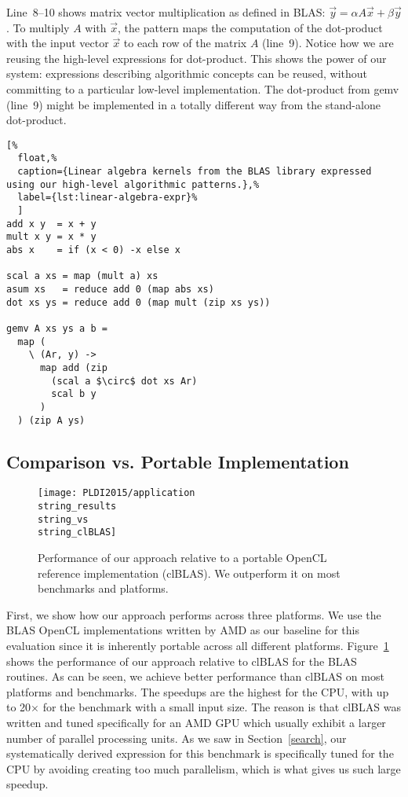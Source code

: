 Line~8--10 shows matrix vector multiplication as defined in BLAS: $\vec{y} = \alpha A \vec{x} + \beta \vec{y}$.
To multiply $A$ with $\vec{x}$, the  pattern maps the computation of the dot-product with the input vector $\vec{x}$ to each row of the matrix $A$ (line~9).
Notice how we are reusing the high-level expressions for dot-product. %
This shows the power of our system: expressions describing algorithmic concepts can be reused, without committing to a particular low-level implementation.
The dot-product from gemv (line~9) might be implemented in a totally different way from the stand-alone dot-product.

\begin{lstlisting}[%
  float,%
  caption={Linear algebra kernels from the BLAS library expressed using our high-level algorithmic patterns.},%
  label={lst:linear-algebra-expr}%
  ]
add x y  = x + y
mult x y = x * y
abs x    = if (x < 0) -x else x

scal a xs = map (mult a) xs
asum xs   = reduce add 0 (map abs xs)
dot xs ys = reduce add 0 (map mult (zip xs ys))

gemv A xs ys a b =
  map (
    \ (Ar, y) ->
      map add (zip
        (scal a $\circ$ dot xs Ar)
        scal b y
      )
  ) (zip A ys)
\end{lstlisting}


\subsection{Comparison vs. Portable Implementation}

\begin{figure}[t]
  \texttt{[image: PLDI2015/application\\string\_results\\string\_vs\\string\_clBLAS]} 
  \caption{Performance of our approach relative to a portable OpenCL reference implementation (clBLAS).
           We outperform it on most benchmarks and platforms.}
  \label{fig:clblas}
\end{figure}

First, we show how our approach performs across three platforms.
We use the BLAS OpenCL implementations written by AMD as our baseline for this evaluation since it is inherently portable across all different platforms.
Figure~\ref{fig:clblas} shows the performance of our approach relative to clBLAS for the BLAS routines. 
As can be seen, we achieve better performance than clBLAS on most platforms and benchmarks.
The speedups are the highest for the CPU, with up to 20$\times$ for the  benchmark with a small input size.
The reason is that clBLAS was written and tuned specifically for an AMD GPU which usually exhibit a larger number of parallel processing units.
As we saw in Section~\ref{search}, our systematically derived expression for this benchmark is specifically tuned for the CPU by avoiding creating too much parallelism, which is what gives us such large speedup.

